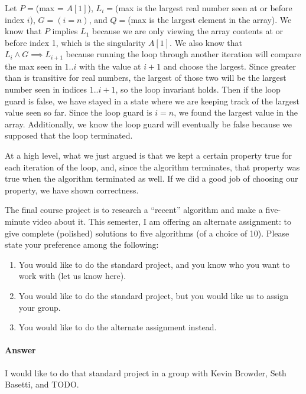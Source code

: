 \documentclass{article}
\begin{document}
Let $P = $(max = $A[1]$), $L_i = $(max is the largest real number seen at or before index $i$), $G = (i = n)$, and $Q = $(max is the largest element in the array).
We know that $P$ implies $L_1$ because we are only viewing the array contents at or before index 1, which is the singularity $A[1]$.
We also know that $L_i \land G \implies L_{i+1}$ because running the loop through another iteration will compare the max seen in $1..i$ with the value at $i+1$ and choose the largest.
Since greater than is transitive for real numbers, the largest of those two will be the largest number seen in indices $1..i+1$, so the loop invariant holds.
Then if the loop guard is false, we have stayed in a state where we are keeping track of the largest value seen so far.
Since the loop guard is $i = n$, we found the largest value in the array.
Additionally, we know the loop guard will eventually be false because we supposed that the loop terminated.

At a high level, what we just argued is that we kept a certain property true for each iteration of the loop, and, since the algorithm terminates, that property was true when the algorithm terminated as well.
If we did a good job of choosing our property, we have shown correctness.


\nextprob
{}

The final course project is to research a ``recent'' algorithm and make a
five-minute video about it.  This semester, I am offering an alternate
assignment: to give complete (polished) solutions to five algorithms (of a
choice of 10).
Please state your preference among the following:

\begin{enumerate}
    \item You would like to do the standard project, and you know who you want to work with (let us know here).
    \item You would like to do the standard project, but you would like us to assign your group.
    \item You would like to do the alternate assignment instead.
\end{enumerate}

\paragraph{Answer}


I would like to do that standard project in a group with Kevin Browder, Seth Basetti, and TODO.

\end{document}
